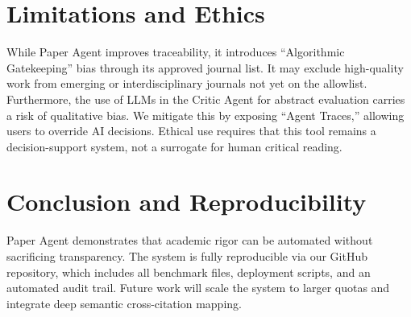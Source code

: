 \documentclass[10pt,twocolumn]{article}
\begin{document}
\section{Limitations and Ethics}

While Paper Agent improves traceability, it introduces ``Algorithmic Gatekeeping'' bias through its approved journal list. It may exclude high-quality work from emerging or interdisciplinary journals not yet on the allowlist. Furthermore, the use of LLMs in the Critic Agent for abstract evaluation carries a risk of qualitative bias. We mitigate this by exposing ``Agent Traces,'' allowing users to override AI decisions. Ethical use requires that this tool remains a decision-support system, not a surrogate for human critical reading.

\section{Conclusion and Reproducibility}

Paper Agent demonstrates that academic rigor can be automated without sacrificing transparency. The system is fully reproducible via our GitHub repository, which includes all benchmark files, deployment scripts, and an automated audit trail. Future work will scale the system to larger quotas and integrate deep semantic cross-citation mapping.
\end{document}
